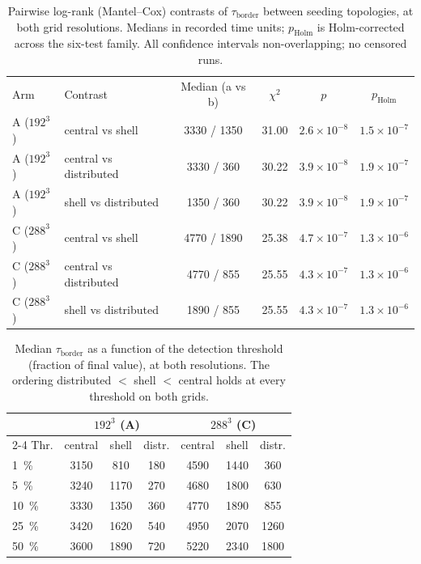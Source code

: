 \documentclass[aps,pre,preprint,superscriptaddress,nofootinbib,floatfix]{revtex4-2}
\newcommand{\tb}{\tau_{\mathrm{border}}}
\begin{document}
\begin{table}[htbp]
\caption{\label{tab:logrank}Pairwise log-rank (Mantel--Cox) contrasts of $\tb$ between seeding topologies, at both grid resolutions. Medians in recorded time units; $p_{\mathrm{Holm}}$ is Holm-corrected across the six-test family. All confidence intervals non-overlapping; no censored runs.}
\begin{ruledtabular}
\begin{tabular}{llcccc}
Arm & Contrast & Median (a vs b) & $\chi^2$ & $p$ & $p_{\mathrm{Holm}}$ \\
\colrule
A ($192^3$) & central vs shell & 3330 / 1350 & 31.00 & $2.6\times10^{-8}$ & $1.5\times10^{-7}$ \\
A ($192^3$) & central vs distributed & 3330 / 360 & 30.22 & $3.9\times10^{-8}$ & $1.9\times10^{-7}$ \\
A ($192^3$) & shell vs distributed & 1350 / 360 & 30.22 & $3.9\times10^{-8}$ & $1.9\times10^{-7}$ \\
C ($288^3$) & central vs shell & 4770 / 1890 & 25.38 & $4.7\times10^{-7}$ & $1.3\times10^{-6}$ \\
C ($288^3$) & central vs distributed & 4770 / 855 & 25.55 & $4.3\times10^{-7}$ & $1.3\times10^{-6}$ \\
C ($288^3$) & shell vs distributed & 1890 / 855 & 25.55 & $4.3\times10^{-7}$ & $1.3\times10^{-6}$ \\
\end{tabular}
\end{ruledtabular}
\end{table}

\begin{table}[htbp]
\caption{\label{tab:threshold}Median $\tb$ as a function of the detection threshold (fraction of final value), at both resolutions. The ordering distributed $<$ shell $<$ central holds at every threshold on both grids.}
\begin{ruledtabular}
\begin{tabular}{lcccccc}
& \multicolumn{3}{c}{$192^3$ (A)} & \multicolumn{3}{c}{$288^3$ (C)} \\
\cline{2-4}\cline{5-7}
Thr. & central & shell & distr. & central & shell & distr. \\
\colrule
\SI{1}{\percent}  & 3150 & 810  & 180 & 4590 & 1440 & 360 \\
\SI{5}{\percent}  & 3240 & 1170 & 270 & 4680 & 1800 & 630 \\
\SI{10}{\percent} & 3330 & 1350 & 360 & 4770 & 1890 & 855 \\
\SI{25}{\percent} & 3420 & 1620 & 540 & 4950 & 2070 & 1260 \\
\SI{50}{\percent} & 3600 & 1890 & 720 & 5220 & 2340 & 1800 \\
\end{tabular}
\end{ruledtabular}
\end{table}
\end{document}
